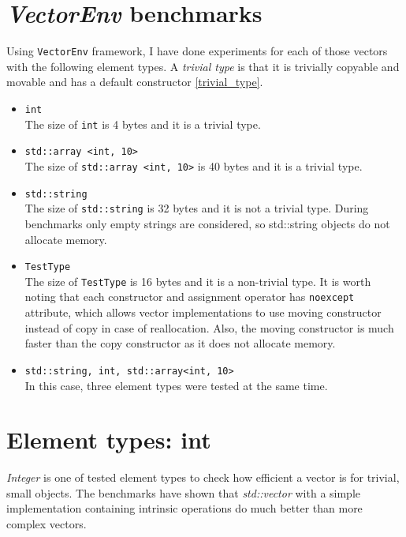 \documentclass[inz, english, shortabstract]{iithesis}
\begin{document}
\section {\emph{VectorEnv} benchmarks}
Using {\tt VectorEnv} framework, I have done experiments for each of those vectors with the following element types.
A \emph{trivial type} is that it is trivially copyable and movable and has a default constructor \ref{trivial_type}.
\begin{itemize}
\item \lstinline{int}{} \\
The size of \lstinline{int}{} is 4 bytes and it is a trivial type. 

\item \lstinline{std::array <int, 10>}{} \\
The size of \lstinline{std::array <int, 10>}{} is 40 bytes and it is a trivial type.

\item \lstinline{std::string}{} \\
The size of \lstinline{std::string} is 32 bytes and it is not a trivial type. During benchmarks only empty strings are considered, so std::string objects do not allocate memory.

\item \lstinline{TestType}{} \\
The size of \lstinline{TestType}{} is 16 bytes and it is a non-trivial type.
It is worth noting that each constructor and assignment operator has {\tt noexcept} attribute, which allows vector implementations to use moving constructor instead of copy in case of reallocation. Also, the moving constructor is much faster than the copy constructor as it does not allocate memory.

\item \lstinline{std::string, int, std::array<int, 10>}{} \\
In this case, three element types were tested at the same time.
\end{itemize}

\clearpage
\section{Element types: int}

\emph{Integer} is one of tested element types to check how efficient a vector is for trivial, small objects.
The benchmarks have shown that {\it std::vector} with a simple implementation containing intrinsic operations do much better than more complex vectors. 
\end{document}
